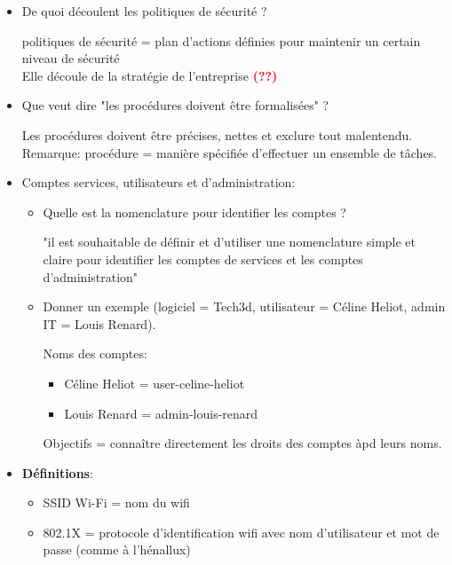 \documentclass[a4paper]{article}
\begin{document}
\begin{itemize}
\item De quoi découlent les politiques de sécurité ?
\begin{example}
    politiques de sécurité = plan d'actions définies pour maintenir un certain niveau de sécurité \\
    Elle découle de la stratégie de l'entreprise \textcolor{red}{\textbf{(??)}}
\end{example}





\item Que veut dire "les procédures doivent être formalisées" ?
\begin{example}
    Les procédures doivent être précises, nettes et exclure tout malentendu. \\
    Remarque: procédure = manière spécifiée d'effectuer un ensemble de tâches.
\end{example}





\item Comptes services, utilisateurs et d’administration:
\begin{itemize}
    \item Quelle est la nomenclature pour identifier les comptes ?
    \begin{example}
        "il est souhaitable de définir et d’utiliser une nomenclature simple et claire pour identifier les comptes de services et les comptes d’administration"
    \end{example}
    \item Donner un exemple (logiciel = Tech3d, utilisateur = Céline Heliot, admin IT = Louis Renard).
    \begin{example}
        Noms des comptes:
        \begin{itemize}
            \item Céline Heliot = user-celine-heliot
            \item Louis Renard = admin-louis-renard
        \end{itemize}
        Objectifs = connaître directement les droits des comptes àpd leurs noms.
    \end{example}
\end{itemize}





\item \textbf{Définitions}:
\begin{itemize}
    \item SSID Wi-Fi = nom du wifi
    \item 802.1X = protocole d'identification wifi avec nom d'utilisateur et mot de passe (comme à l'hénallux)
\end{itemize}






\end{itemize}
\end{document}
